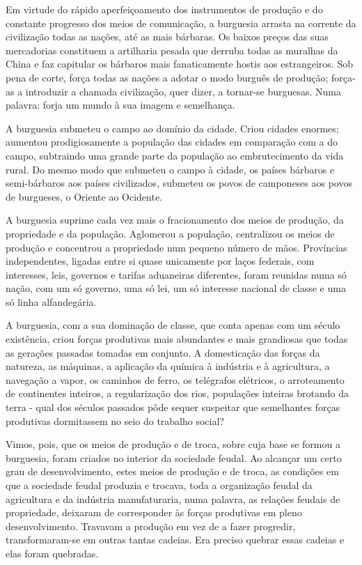 Em virtude do rápido aperfeiçoamento dos instrumentos de produção e do
constante progresso dos meios de comunicação, a burguesia arrasta na
corrente da civilização todas as nações, até as mais bárbaras. Os
baixos preços das suas mercadorias constituem a artilharia pesada que
derruba todas as muralhas da China e faz capitular os bárbaros mais
fanaticamente hostis aos estrangeiros. Sob pena de corte, força todas
as nações a adotar o modo burguês de produção; força-as a introduzir a
chamada civilização, quer dizer, a tornar-se burguesas. Numa palavra:
forja um mundo à sua imagem e semelhança.

A burguesia submeteu o campo ao domínio da cidade. Criou cidades
enormes; aumentou prodigiosamente a população das cidades em
comparação com a do campo, subtraindo uma grande parte da população ao
embrutecimento da vida rural. Do mesmo modo que submeteu o campo à
cidade, os países bárbaros e semi-bárbaros aos países civilizados,
submeteu os povos de camponeses aos povos de burgueses, o Oriente ao
Ocidente.

A burguesia suprime cada vez mais o fracionamento dos meios de
produção, da propriedade e da população. Aglomerou a população,
centralizou os meios de produção e concentrou a propriedade num
pequeno número de mãos. Províncias independentes, ligadas entre si
quase unicamente por laços federais, com interesses, leis, governos e
tarifas aduaneiras diferentes, foram reunidas numa só nação, com um só
governo, uma só lei, um só interesse nacional de classe e uma só linha
alfandegária.

A burguesia, com a sua dominação de classe, que conta apenas com um
século existência, criou forças produtivas mais abundantes e mais
grandiosas que todas as gerações passadas tomadas em conjunto. A
domesticação das forças da natureza, as máquinas, a aplicação da
química à indústria e à agricultura, a navegação a vapor, os caminhos
de ferro, os telégrafos elétricos, o arroteamento de continentes
inteiros, a regularização dos rios, populações inteiras brotando da
terra - qual dos séculos passados pôde sequer suspeitar que
semelhantes forças produtivas dormitassem no seio do trabalho social?

Vimos, pois, que os meios de produção e de troca, sobre cuja base se
formou a burguesia, foram criados no interior da sociedade feudal. Ao
alcançar um certo grau de desenvolvimento, estes meios de produção e
de troca, as condições em que a sociedade feudal produzia e trocava,
toda a organização feudal da agricultura e da indústria manufaturaria,
numa palavra, as relações feudais de propriedade, deixaram de
corresponder às forças produtivas em pleno desenvolvimento. Travavam a
produção em vez de a fazer progredir, transformaram-se em outras
tantas cadeias. Era preciso quebrar essas cadeias e elas foram
quebradas.

